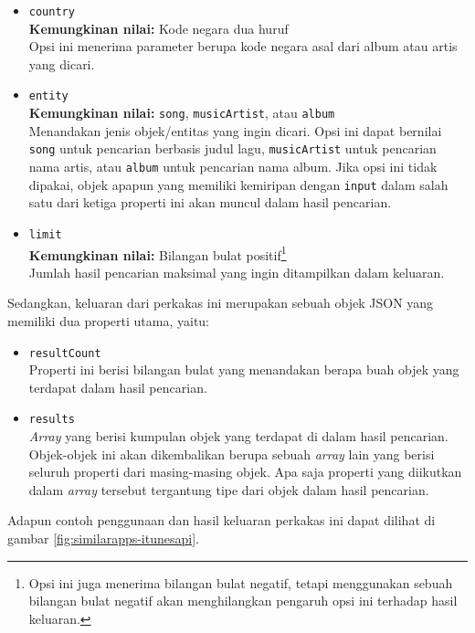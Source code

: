 \documentclass[a4paper,twoside]{article}
\begin{document}
\begin{enumerate}
\begin{itemize}
	\item \verb|country|\\
	\textbf{Kemungkinan nilai:} Kode negara dua huruf\\
	Opsi ini menerima parameter berupa kode negara asal dari album atau artis yang dicari.
	\item \verb|entity|\\
	\textbf{Kemungkinan nilai:} \verb|song|, \verb|musicArtist|, atau \verb|album|\\
	Menandakan jenis objek/entitas yang ingin dicari. Opsi ini dapat bernilai \verb|song| untuk pencarian berbasis judul lagu, \verb|musicArtist| untuk pencarian nama artis, atau \verb|album| untuk pencarian nama album. Jika opsi ini tidak dipakai, objek apapun yang memiliki kemiripan dengan \verb|input| dalam salah satu dari ketiga properti ini akan muncul dalam hasil pencarian.
	\item \verb|limit|\\
	\textbf{Kemungkinan nilai:} Bilangan bulat positif\footnote{Opsi ini juga menerima bilangan bulat negatif, tetapi menggunakan sebuah bilangan bulat negatif akan menghilangkan pengaruh opsi ini terhadap hasil keluaran.}\\
	Jumlah hasil pencarian maksimal yang ingin ditampilkan dalam keluaran.
\end{itemize}
\vspace{\baselineskip}
Sedangkan, keluaran dari perkakas ini merupakan sebuah objek JSON yang memiliki dua properti utama, yaitu:

\begin{itemize}
	\item \verb|resultCount|\\
	Properti ini berisi bilangan bulat yang menandakan berapa buah objek yang terdapat dalam hasil pencarian.
	\item \verb|results|\\
	\textit{Array} yang berisi kumpulan objek yang terdapat di dalam hasil pencarian. Objek-objek ini akan dikembalikan berupa sebuah \textit{array} lain yang berisi seluruh properti dari masing-masing objek. Apa saja properti yang diikutkan dalam \textit{array} tersebut tergantung tipe dari objek dalam hasil pencarian.
\end{itemize}
\vspace{\baselineskip}
Adapun contoh penggunaan dan hasil keluaran perkakas ini dapat dilihat di gambar \ref{fig:similarapps-itunesapi}.


\end{enumerate}
\end{document}
